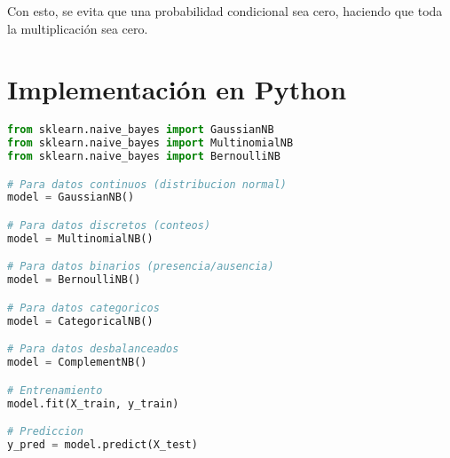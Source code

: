 \documentclass[12pt]{article}
\begin{document}
\vspace{0.5em}

Con esto, se evita que una probabilidad condicional sea cero, haciendo que toda la multiplicación sea cero.

\section{Implementación en Python}

\begin{lstlisting}[language=Python]
from sklearn.naive_bayes import GaussianNB
from sklearn.naive_bayes import MultinomialNB
from sklearn.naive_bayes import BernoulliNB

# Para datos continuos (distribucion normal)
model = GaussianNB()

# Para datos discretos (conteos)
model = MultinomialNB()

# Para datos binarios (presencia/ausencia)
model = BernoulliNB()

# Para datos categoricos
model = CategoricalNB()

# Para datos desbalanceados
model = ComplementNB()

# Entrenamiento
model.fit(X_train, y_train)

# Prediccion
y_pred = model.predict(X_test)
\end{lstlisting}
\end{document}
